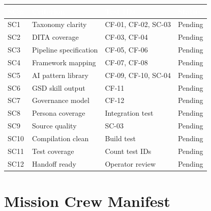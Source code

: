\documentclass[11pt,letterpaper]{article}
\newcommand{\tableheader}[1]{\textbf{\sffamily\textcolor{white}{#1}}}
\begin{document}
\begin{center}
\begin{tabularx}{\textwidth}{L{1cm}L{5cm}L{3cm}C{2cm}}
\toprule
{}
\tableheader{SC\#} & \tableheader{Criterion} & \tableheader{Test IDs} & \tableheader{Status} \\
\midrule
SC1 & Taxonomy clarity & CF-01, CF-02, SC-03 & Pending \\
SC2 & DITA coverage & CF-03, CF-04 & Pending \\
SC3 & Pipeline specification & CF-05, CF-06 & Pending \\
SC4 & Framework mapping & CF-07, CF-08 & Pending \\
SC5 & AI pattern library & CF-09, CF-10, SC-04 & Pending \\
SC6 & GSD skill output & CF-11 & Pending \\
SC7 & Governance model & CF-12 & Pending \\
SC8 & Persona coverage & Integration test & Pending \\
SC9 & Source quality & SC-03 & Pending \\
SC10 & Compilation clean & Build test & Pending \\
SC11 & Test coverage & Count test IDs & Pending \\
SC12 & Handoff ready & Operator review & Pending \\
\bottomrule
\end{tabularx}
\end{center}

\section{Mission Crew Manifest}
\end{document}
